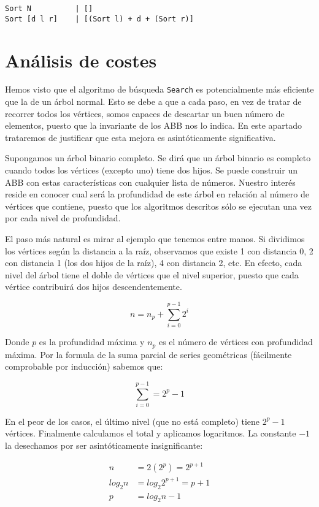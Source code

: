 \documentclass[10pt,spanish,twocolumn]{article}
\begin{document}
\begin{lstlisting}
Sort N          | []
Sort [d l r]    | [(Sort l) + d + (Sort r)]
\end{lstlisting}

\section{Análisis de costes}
Hemos visto que el algoritmo de búsqueda \texttt{Search} es potencialmente más 
eficiente que la de un árbol normal.  Esto se debe a que a cada paso, en vez de 
tratar de recorrer todos los vértices, somos capaces de descartar un buen 
número de elementos, puesto que la invariante de los ABB nos lo indica.  En 
este apartado trataremos de justificar que esta mejora es asintóticamente 
significativa.

Supongamos un árbol binario completo.  Se dirá que un árbol binario es completo 
cuando todos los vértices (excepto uno) tiene dos hijos.  Se puede construir un 
ABB con estas características con cualquier lista de números.  Nuestro interés 
reside en conocer cual será la profundidad de este árbol en relación al número 
de vértices que contiene, puesto que los algoritmos descritos sólo se ejecutan 
una vez por cada nivel de profundidad.

El paso más natural es mirar al ejemplo que tenemos entre manos.  Si dividimos 
los vértices según la distancia a la raíz, observamos que existe 1 con 
distancia 0, 2 con distancia 1 (los dos hijos de la raíz), 4 con distancia 2, 
etc.  En efecto, cada nivel del árbol tiene el doble de vértices que el nivel 
superior, puesto que cada vértice contribuirá dos hijos descendentemente.

$$
    n = n_p + \displaystyle\sum\limits_{i=0}^{p-1} 2^i
$$

Donde $p$ es la profundidad máxima y $n_p$ es el número de vértices con 
profundidad máxima.  Por la formula de la suma parcial de series geométricas 
(fácilmente comprobable por inducción) sabemos que:

$$
    \displaystyle\sum\limits_{i=0}^{p-1} = 2^p - 1
$$

En el peor de los casos, el último nivel (que no está completo) tiene $2^p - 1$
vértices.  Finalmente calculamos el total y aplicamos logaritmos.  La constante 
$-1$ la desechamos por ser asintóticamente insignificante:

\begin{align*}
    n &= 2(2^p)= 2^{p+1}\\
    log_2 n &= log_2 2^{p+1} = p + 1\\
    p &= log_2 n - 1
\end{align*}
\end{document}
